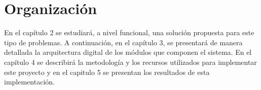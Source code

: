 \section{Organización}

En el capítulo 2 se estudiará, a nivel funcional, una solución propuesta para este tipo de problemas. A continuación, en el capítulo 3, se presentará de manera detallada la arquitectura digital de los módulos que componen el sistema. En el capítulo 4 se describirá la metodología y los recursos utilizados para implementar este proyecto y en el capitulo 5 se presentan los resultados de esta implementación.






